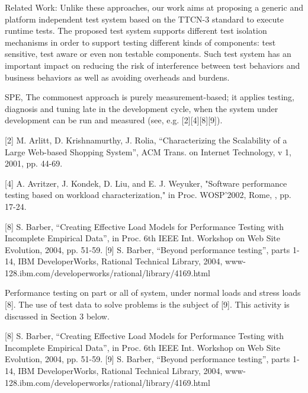 \documentclass[runningheads,a4paper]{llncs}
\begin{document}
Related Work: Unlike these approaches, our work aims at proposing a generic and platform
independent test system based on the TTCN-3 standard to execute runtime
tests. The proposed test system supports different test isolation mechanisms in
order to support testing different kinds of components: test sensitive, test aware
or even non testable components. Such test system has an important impact on
reducing the risk of interference between test behaviors and business behaviors
as well as avoiding overheads and burdens.

SPE, The commonest approach is purely measurement-based; it
applies testing, diagnosis and tuning late in the development cycle, 
when the system under development can be run and measured (see, e.g.
[2][4][8][9]).

[2] M. Arlitt, D. Krishnamurthy, J. Rolia, “Characterizing
the Scalability of a Large Web-based Shopping System'',
ACM Trans. on Internet Technology, v 1, 2001, pp. 44-69.

[4] A. Avritzer, J. Kondek, D. Liu, and E. J. Weyuker,
"Software performance testing based on workload
characterization," in Proc. WOSP’2002, Rome, , pp. 17-24.

[8] S. Barber, “Creating Effective Load Models for
Performance Testing with Incomplete Empirical Data”, in
Proc. 6th IEEE Int. Workshop on Web Site Evolution, 2004,
pp. 51-59.
[9] S. Barber, “Beyond performance testing”, parts 1-14,
IBM DeveloperWorks, Rational Technical Library, 2004,
www-128.ibm.com/developerworks/rational/library/4169.html

Performance testing on part or all of system, under
normal loads and stress loads [8]. The use of test data
to solve problems is the subject of [9]. This activity is
discussed in Section 3 below.

[8] S. Barber, “Creating Effective Load Models for
Performance Testing with Incomplete Empirical Data”, in
Proc. 6th IEEE Int. Workshop on Web Site Evolution, 2004,
pp. 51-59.
[9] S. Barber, “Beyond performance testing”, parts 1-14,
IBM DeveloperWorks, Rational Technical Library, 2004,
www-128.ibm.com/developerworks/rational/library/4169.html
\end{document}
